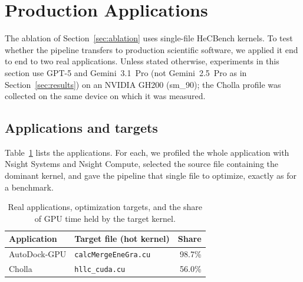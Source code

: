 \section{Production Applications}
\label{sec:realapps}
The ablation of Section~\ref{sec:ablation} uses single-file HeCBench kernels. To test whether the
pipeline transfers to production scientific software, we applied it end to end to two real
applications.
Unless stated otherwise, experiments in this section use GPT-5 and Gemini~3.1~Pro
(not Gemini~2.5~Pro as in Section~\ref{sec:results}) on an NVIDIA GH200 (sm\_90); the Cholla
profile was collected on the same device on which it was measured.

\subsection{Applications and targets}
Table~\ref{tab:apps} lists the applications. For each, we profiled the whole application with Nsight
Systems and Nsight Compute, selected the source file containing the dominant kernel, and gave the
pipeline that single file to optimize, exactly as for a benchmark.

\begin{table}[t]
\centering
\footnotesize
\caption{Real applications, optimization targets, and the share of GPU time held by the target kernel.}
\label{tab:apps}
\setlength{\tabcolsep}{3pt}
\begin{tabular}{@{}llr@{}}
\toprule
\textbf{Application} & \textbf{Target file (hot kernel)} & \textbf{Share} \\
\midrule
AutoDock-GPU & \texttt{calcMergeEneGra.cu} & 98.7\% \\
Cholla & \texttt{hllc\_cuda.cu} & 56.0\% \\
\bottomrule
\end{tabular}
\end{table}

